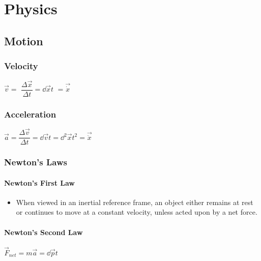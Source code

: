 \chapter{Physics}

	\section{Motion}

\subsection{Velocity}

\begin{itemize}
\itemt \( \vec{v} = \) \( \dfrac{\Delta \vec{x}}{\Delta t} = \dd{\vec{x}}{t} \) \(= \vec{\dot{x}}  \)
\end{itemize}

\subsection{Acceleration}

\begin{itemize}
\itemt \( \vec{a} = \dfrac{\Delta \vec{v}}{\Delta t} = \dd{\vec{v}}{t} = \dd{^2 \vec{x}}{t^2} = \vec{\ddot{x}}  \)	
\end{itemize}            
		
\subsection{Newton's Laws}

\subsubsection{Newton's First Law}
\begin{itemize}
\item When viewed in an inertial reference frame, an object either remains at rest or continues to move at a constant velocity, unless acted upon by a net force.
\end{itemize}

\subsubsection{Newton's Second Law}
\begin{itemize}
\itemt \(\vec{F}_{net} = m\vec{a} = \dd{\vec{p}}{t}	\)
\end{itemize}

